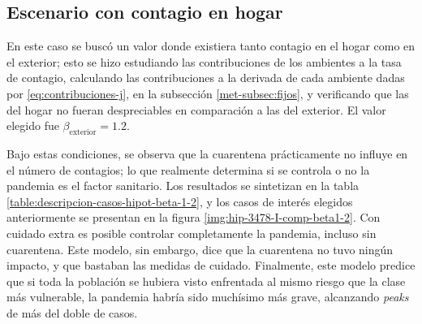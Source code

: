 \subsection{Escenario con contagio en hogar}\label{eval:beta-chico}


En este caso se buscó un valor donde existiera tanto contagio en el hogar como en el exterior; esto se hizo estudiando las contribuciones de los ambientes a la tasa de contagio, calculando las contribuciones a la derivada de cada ambiente dadas por \ref{eq:contribuciones-j}, en la subsección \ref{met-subsec:fijos}, y verificando que las del hogar no fueran despreciables en comparación a las del exterior. El valor elegido fue \(\beta_{\text{exterior}} = 1.2\).

Bajo estas condiciones, se observa que la cuarentena prácticamente no influye en el número de contagios; lo que realmente determina si se controla o no la pandemia es el factor sanitario. Los resultados se sintetizan en la tabla \ref{table:descripcion-casos-hipot-beta-1-2}, y los casos de interés elegidos anteriormente se presentan en la figura \ref{img:hip-3478-I-comp-beta1-2}. Con cuidado extra es posible controlar completamente la pandemia, incluso sin cuarentena. Este modelo, sin embargo, dice que la cuarentena no tuvo ningún impacto, y que bastaban las medidas de cuidado. Finalmente, este modelo predice que si toda la población se hubiera visto enfrentada al mismo riesgo que la clase más vulnerable, la pandemia habría sido muchísimo más grave, alcanzando \textit{peaks} de más del doble de casos.




